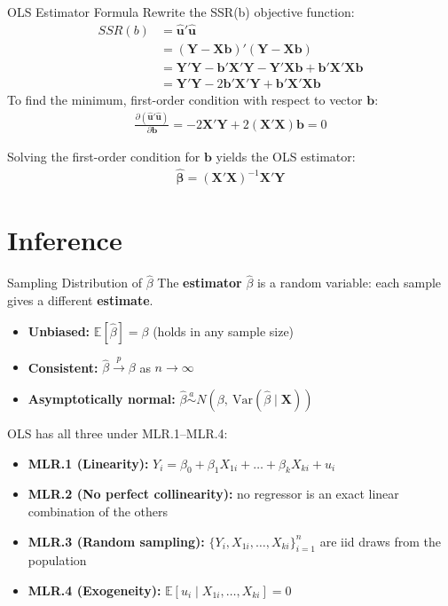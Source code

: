 \documentclass[9pt,aspectratio=169]{beamer}
\newcommand{\E}{\mathbb{E}}
\newcommand{\Var}{\mathrm{Var}}
\begin{document}
\begin{frame}{OLS Estimator Formula}
Rewrite the SSR(b) objective function:
\begin{align*}
SSR(b) &= \hat{\mathbf{u}}'\hat{\mathbf{u}} \\
&=(\mathbf{Y}-\mathbf{X}\boldsymbol{b})'(\mathbf{Y}-\mathbf{X}\boldsymbol{b})\\
        &= \mathbf{Y}'\mathbf{Y}-\boldsymbol{b}'\mathbf{X}'\mathbf{Y}-\mathbf{Y}'\mathbf{X}\boldsymbol{b}+\boldsymbol{b}'\mathbf{X}'\mathbf{X}\boldsymbol{b}\\
        &=
        \mathbf{Y}'\mathbf{Y}-2\boldsymbol{b}'\mathbf{X}'\mathbf{Y}+\boldsymbol{b}'\mathbf{X}'\mathbf{X}\boldsymbol{b}
\end{align*}
\pause
To find the minimum, first-order condition with respect to vector $\boldsymbol{b}$:
\begin{align*}
\frac{\partial(\hat{\mathbf{u}}'\hat{\mathbf{u}})}{\partial\boldsymbol{b}}=-2\mathbf{X}'\mathbf{Y}+2(\mathbf{X}'\mathbf{X})\boldsymbol{b}=0
\end{align*}


Solving the first-order condition for $\mathbf{b}$ yields the OLS estimator: 
\begin{align*}
    \hat{\boldsymbol{\beta}} =
    (\mathbf{X}'\mathbf{X})^{-1}\mathbf{X}'\mathbf{Y}
\end{align*}
\end{frame}

\section{Inference}

\begin{frame}{Sampling Distribution of $\hat\beta$}
\linespread{1.2}\selectfont
  The \textbf{estimator} $\hat\beta$ is a random variable: each sample gives a different \textbf{estimate}.
  \medskip

  \begin{itemize}
    \item \textbf{Unbiased:} $\E[\hat\beta]=\beta$ (holds in any sample size)
    \item \textbf{Consistent:} $\hat\beta\xrightarrow{p}\beta$ as $n\to\infty$
    \item \textbf{Asymptotically normal:} $\hat\beta \overset{a}{\sim} N\!\left(\beta,\ \Var(\hat\beta\mid\bm X)\right)$
  \end{itemize}
  \medskip
  OLS has all three under MLR.1--MLR.4:
  \begin{itemize}
    \item \textbf{MLR.1 (Linearity):} $Y_i=\beta_0+\beta_1X_{1i}+\dots+\beta_kX_{ki}+u_i$
    \item \textbf{MLR.2 (No perfect collinearity):} no regressor is an exact linear combination of the others
    \item \textbf{MLR.3 (Random sampling):} $\{Y_i,X_{1i},\dots,X_{ki}\}_{i=1}^n$ are iid draws from the population
    \item \textbf{MLR.4 (Exogeneity):} $\E[u_i\mid X_{1i},\dots,X_{ki}]=0$
  \end{itemize}
\end{frame}
\end{document}
